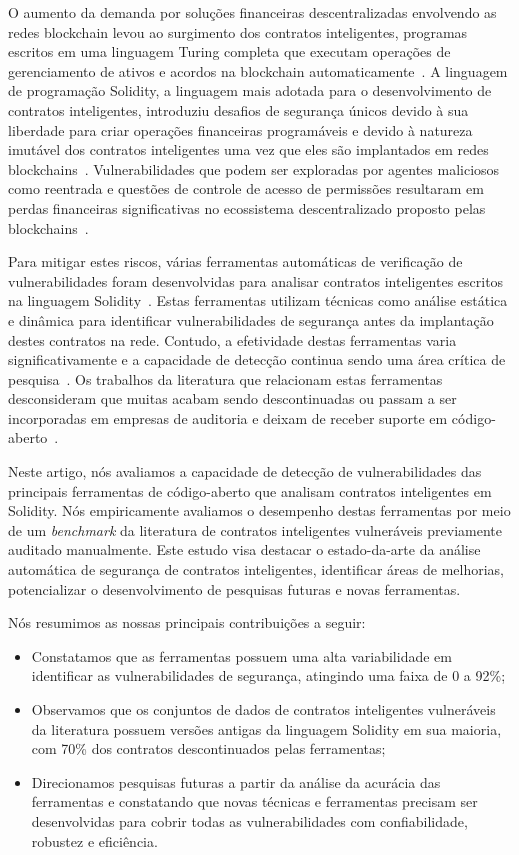 \documentclass[12pt]{article}
\begin{document}
O aumento da demanda por soluções financeiras descentralizadas envolvendo as redes blockchain levou ao surgimento dos contratos inteligentes, programas escritos em uma linguagem Turing completa que executam operações de gerenciamento de ativos e acordos na blockchain automaticamente~\cite{buterin2013ethereum}. A linguagem de programação Solidity, a linguagem mais adotada para o desenvolvimento de contratos inteligentes, introduziu desafios de segurança únicos devido à sua liberdade para criar operações financeiras programáveis e devido à natureza imutável dos contratos inteligentes uma vez que eles são implantados em redes blockchains~\cite{wohrer2018smart}. Vulnerabilidades que podem ser exploradas por agentes maliciosos como reentrada e questões de controle de acesso de permissões resultaram em perdas financeiras significativas no ecossistema descentralizado proposto pelas blockchains~\cite{mense2018security}.

Para mitigar estes riscos, várias ferramentas automáticas de verificação de vulnerabilidades foram desenvolvidas para analisar contratos inteligentes escritos na linguagem Solidity~\cite{khan2024survey}. Estas ferramentas utilizam técnicas como análise estática e dinâmica para identificar vulnerabilidades de segurança antes da implantação destes contratos na rede. Contudo, a efetividade destas ferramentas varia significativamente e a capacidade de detecção continua sendo uma área crítica de pesquisa~\cite{ressi2024vulnerability}. Os trabalhos da literatura que relacionam estas ferramentas desconsideram que muitas acabam sendo descontinuadas ou passam a ser incorporadas em empresas de auditoria e deixam de receber suporte em código-aberto~\cite{kushwaha2022ethereum}.

Neste artigo, nós avaliamos a capacidade de detecção de vulnerabilidades das principais ferramentas de código-aberto que analisam contratos inteligentes em Solidity. Nós empiricamente avaliamos o desempenho destas ferramentas por meio de um \textit{benchmark} da literatura \cite{di2023consolidation} de contratos inteligentes vulneráveis previamente auditado manualmente. Este estudo visa destacar o estado-da-arte da análise automática de segurança de contratos inteligentes, identificar áreas de melhorias, potencializar o desenvolvimento de pesquisas futuras e novas ferramentas.

Nós resumimos as nossas principais contribuições a seguir:

\begin{itemize}
    \item Constatamos que as ferramentas possuem uma alta variabilidade em identificar as vulnerabilidades de segurança, atingindo uma faixa de 0 a 92\%;
    \item Observamos que os conjuntos de dados de contratos inteligentes vulneráveis da literatura possuem versões antigas da linguagem Solidity em sua maioria, com 70\% dos contratos descontinuados pelas ferramentas;
    \item Direcionamos pesquisas futuras a partir da análise da acurácia das ferramentas e constatando que novas técnicas e ferramentas precisam ser desenvolvidas para cobrir todas as vulnerabilidades com confiabilidade, robustez e eficiência.
\end{itemize}
\end{document}

